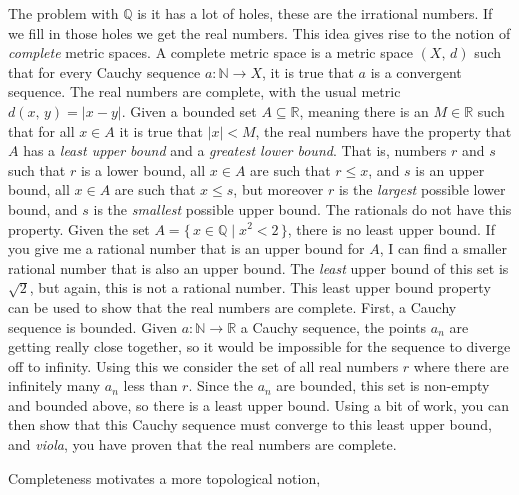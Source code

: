 \documentclass{article}
\theoremstyle{plain}
\theoremstyle{normal}
\newenvironment{definition}{%
    \pushQED{\qed}\renewcommand{\qedsymbol}{$\blacksquare$}\definitionx%
}{%
    \popQED\enddefinitionx%
}
\begin{document}
        The problem with $\mathbb{Q}$ is it has a lot of holes, these are the
        irrational numbers. If we fill in those holes we get the real numbers.
        This idea gives rise to the notion of \textit{complete} metric spaces.
        \begin{definition}[\textbf{Complete Metric Space}]
            A complete metric space is a metric space $(X,\,d)$ such that for
            every Cauchy sequence $a:\mathbb{N}\rightarrow{X}$, it is true
            that $a$ is a convergent sequence.
        \end{definition}
        The real numbers are complete, with the usual metric
        $d(x,\,y)=|x-y|$. Given a bounded set $A\subseteq\mathbb{R}$, meaning
        there is an $M\in\mathbb{R}$ such that for all $x\in{A}$ it is true
        that $|x|<M$, the real numbers have the property that $A$ has a
        \textit{least upper bound} and a \textit{greatest lower bound}. That is,
        numbers $r$ and $s$ such that $r$ is a lower bound, all $x\in{A}$
        are such that $r\leq{x}$, and $s$ is an upper bound, all $x\in{A}$
        are such that $x\leq{s}$, but moreover $r$ is the \textit{largest}
        possible lower bound, and $s$ is the \textit{smallest} possible upper
        bound. The rationals do not have this property. Given the set
        $A=\{\,x\in\mathbb{Q}\;|\;x^{2}<2\,\}$, there is no least upper bound.
        If you give me a rational number that is an upper bound for $A$, I can
        find a smaller rational number that is also an upper bound. The
        \textit{least} upper bound of this set is $\sqrt{2}$, but again, this
        is not a rational number. This least upper bound property can be
        used to show that the real numbers are complete. First, a Cauchy
        sequence is bounded. Given $a:\mathbb{N}\rightarrow\mathbb{R}$ a
        Cauchy sequence, the points $a_{n}$ are getting really close together,
        so it would be impossible for the sequence to diverge off to infinity.
        Using this we consider the set of all real numbers $r$ where there are
        infinitely many $a_{n}$ less than $r$. Since the $a_{n}$ are bounded,
        this set is non-empty and bounded above, so there is a least upper
        bound. Using a bit of work, you can then show that this Cauchy
        sequence must converge to this least upper bound, and \textit{viola},
        you have proven that the real numbers are complete.
        \par\hfill\par
        Completeness motivates a more topological notion,
\end{document}
